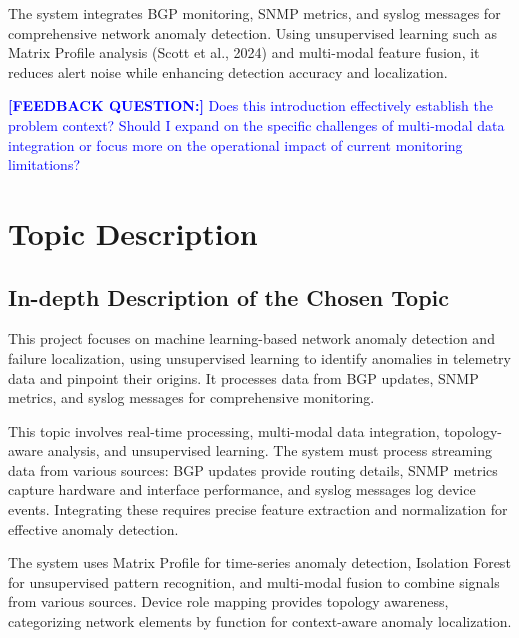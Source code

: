 \documentclass[11pt]{article}
\begin{document}
The system integrates BGP monitoring, SNMP metrics, and syslog messages for comprehensive network anomaly detection. Using unsupervised learning such as Matrix Profile analysis (Scott et al., 2024) and multi-modal feature fusion, it reduces alert noise while enhancing detection accuracy and localization.

\textcolor{blue}{\textbf{[FEEDBACK QUESTION:]} Does this introduction effectively establish the problem context? Should I expand on the specific challenges of multi-modal data integration or focus more on the operational impact of current monitoring limitations?}

\section{Topic Description}

\subsection{In-depth Description of the Chosen Topic}

This project focuses on machine learning-based network anomaly detection and failure localization, using unsupervised learning to identify anomalies in telemetry data and pinpoint their origins. It processes data from BGP updates, SNMP metrics, and syslog messages for comprehensive monitoring.

This topic involves real-time processing, multi-modal data integration, topology-aware analysis, and unsupervised learning. The system must process streaming data from various sources: BGP updates provide routing details, SNMP metrics capture hardware and interface performance, and syslog messages log device events. Integrating these requires precise feature extraction and normalization for effective anomaly detection.

The system uses Matrix Profile for time-series anomaly detection, Isolation Forest for unsupervised pattern recognition, and multi-modal fusion to combine signals from various sources. Device role mapping provides topology awareness, categorizing network elements by function for context-aware anomaly localization.
\end{document}
